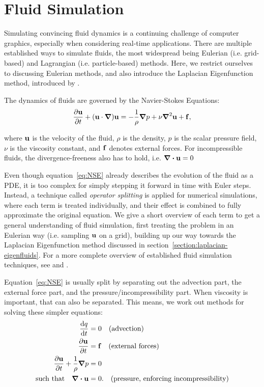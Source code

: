 \chapter{Fluid Simulation}\label{chapter:fluid-simulation}
Simulating convincing fluid dynamics is a continuing challenge of computer
graphics, especially when considering real-time applications. There are multiple
established ways to simulate fluids, the most widespread being Eulerian (i.e.
grid-based) and Lagrangian (i.e. particle-based) methods. Here, we restrict
ourselves to discussing Eulerian methods, and also introduce the Laplacian
Eigenfunction method, introduced by \citet{dewitt}.

The dynamics of fluids are governed by the Navier-Stokes Equations:
\begin{equation}\label{eq:NSE}
    \pdv{\vb{u}}{t} + (\vb{u}\cdot\grad)\vb{u}
    = -\frac{1}{\rho}\grad{p} + \nu\grad^2\vb{u} + \vb{f},
\end{equation}

where $\vb{u}$ is the velocity of the fluid, $\rho$ is the density, $p$ is the
scalar pressure field, $\nu$ is the viscosity constant, and $\vb{f}$ denotes
external forces. For incompressible fluids, the divergence-freeness also has to
hold, i.e. $\div{\vb{u}} = 0$

Even though equation~\eqref{eq:NSE} already describes the evolution of the fluid
as a \acf{PDE}, it is too complex for simply stepping it forward in time with
Euler steps. Instead, a technique called \textit{operator splitting} is applied
for numerical simulations, where each term is treated individually, and their
effect is combined to fully approximate the original equation. We give
a short overview of each term to get a general understanding of fluid
simulation, first treating the problem in an Eulerian way (i.e.  sampling
$\vb{u}$ on a grid), building up our way towards the Laplacian Eigenfunction
method discussed in section~\ref{section:laplacian-eigenfluids}.  For a more
complete overview of established fluid simulation techniques, see
\cite{FluidNotes} and \cite{BridsonFluid}.

Equation~\eqref{eq:NSE} is usually split by separating out the advection part,
the external force part, and the pressure/incompressibility part. When viscosity
is important, that can also be separated. This means, we work out methods for
solving these simpler equations:
\begin{align*}
    \dv{q}{t} &= 0              \qq{(advection)}\\
    \pdv{\vb{u}}{t} &= \vb{f}   \qq{(external forces)}\\
    \pdv{\vb{u}}{t} + \frac{1}{\rho}\grad p &= 0 \\
    \qq{such that}\div{\vb{u}} &= 0.
                                \qq{(pressure, enforcing incompressibility)}
\end{align*}

